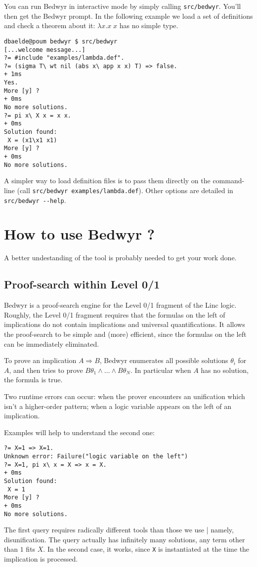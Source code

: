\documentclass{article}
\begin{document}
You can run Bedwyr in interactive mode by simply calling \texttt{src/bedwyr}.
You'll then get the Bedwyr prompt. In the following example we load a set of 
definitions and check a theorem about it: $\lambda x.x\;x$ has no simple type.

\begin{verbatim}
dbaelde@poum bedwyr $ src/bedwyr
[...welcome message...]
?= #include "examples/lambda.def".
?= (sigma T\ wt nil (abs x\ app x x) T) => false.
+ 1ms
Yes.
More [y] ?
+ 0ms
No more solutions.
?= pi x\ X x = x x.
+ 0ms
Solution found:
 X = (x1\x1 x1)
More [y] ?
+ 0ms
No more solutions.
\end{verbatim}

A simpler way to load definition files is to pass them directly on the
command-line (call \verb|src/bedwyr examples/lambda.def|).
Other options are detailed in \verb.src/bedwyr --help..

\newpage
\section{How to use Bedwyr ?}
\label{sec:howto}

A better undestanding of the tool is probably needed to get your work done.

\subsection{Proof-search within Level 0/1}

Bedwyr is a proof-search engine for the Level 0/1 fragment of the Linc logic.
Roughly, the Level 0/1 fragment requires that the formulas on the left of
implications do not contain implications and universal quantifications.
It allows the proof-search to be simple and (more) efficient,
since the formulas on the left can be immediately eliminated.

To prove an implication $A\Rightarrow B$,
Bedwyr enumerates all possible solutions $\theta_i$ for $A$,
and then tries to prove $B\theta_1\wedge\dots\wedge B\theta_N$.
In particular when $A$ has no solution, the formula is true.

Two runtime errors can occur:
when the prover encounters an unification which isn't a higher-order pattern;
when a logic variable appears on the left of an implication.

Examples will help to understand the second one:
\begin{verbatim}
?= X=1 => X=1.
Unknown error: Failure("logic variable on the left")
?= X=1, pi x\ x = X => x = X.
+ 0ms
Solution found:
 X = 1
More [y] ?
+ 0ms
No more solutions.
\end{verbatim}
The first query requires radically different tools than those we use |
namely, disunification. The query actually has infinitely many solutions,
any term other than $1$ fits $X$.
In the second case, it works, since \verb.X. is instantiated at the time the
implication is processed.
\end{document}
